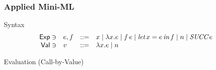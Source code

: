 \documentclass[pdftex,aspectratio=169]{beamer}
\begin{document}
\begin{frame}
  \frametitle{Applied Mini-ML}
  \vspace{-\baselineskip}
  \begin{block}{Syntax}
    \begin{displaymath}
      \begin{array}{rlcl}
        \mathsf{Exp} \ni & e,f & ::= & x \mid \Lam{x}e \mid \App{f}e
        \mid \Let{x}{e}f \mid n \mid \Succ e \\
        \mathsf{Val} \ni & v & ::= & \Lam{x}e \mid n
      \end{array}
    \end{displaymath}
  \vspace{-1\baselineskip}
  \end{block}
  \begin{block}{Evaluation (Call-by-Value)}
    \begin{mathpar}






    \end{mathpar}
    \vspace{-1\baselineskip}
  \end{block}
\end{frame}
\end{document}
